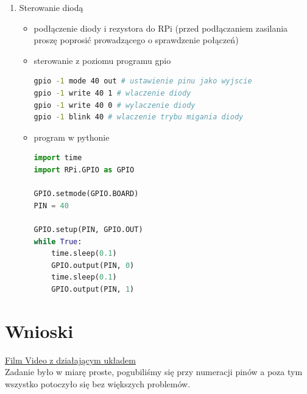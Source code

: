 \documentclass[a4paper,12pt]{extarticle}  %
\begin{document}
\begin{enumerate}
	\item Sterowanie diodą
	      \begin{itemize}
		      \item podłączenie diody i rezystora do RPi (przed podłączaniem zasilania proszę poprosić prowadzącego o sprawdzenie połączeń)
		            \begin{figure}[H]
			            \centering
		            \end{figure}
		      \item sterowanie z poziomu programu gpio
		            \begin{lstlisting}[language = Bash]
gpio -1 mode 40 out # ustawienie pinu jako wyjscie
gpio -1 write 40 1 # wlaczenie diody
gpio -1 write 40 0 # wylaczenie diody
gpio -1 blink 40 # wlaczenie trybu migania diody
\end{lstlisting}
		      \item program w pythonie
		            \begin{lstlisting}[language = Python]
import time
import RPi.GPIO as GPIO

GPIO.setmode(GPIO.BOARD)
PIN = 40

GPIO.setup(PIN, GPIO.OUT)
while True:
    time.sleep(0.1)
    GPIO.output(PIN, 0)
    time.sleep(0.1)
    GPIO.output(PIN, 1)
        \end{lstlisting}
	      \end{itemize}
\end{enumerate}

\section{Wnioski}
\href{https://s3.baraniecki.eu/rasp_led.webm}{Film Video z działającym układem}\\
Zadanie było w miarę proste, pogubiliśmy się przy numeracji pinów a poza tym wszystko potoczyło się bez większych problemów.
\end{document}
